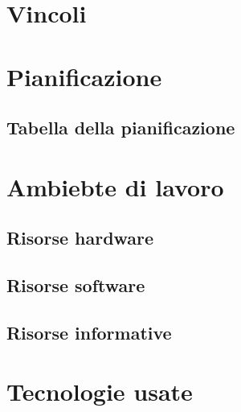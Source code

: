 \section{Vincoli}

\section{Pianificazione}
\subsection{Tabella della pianificazione}

\section{Ambiebte di lavoro}
\subsection{Risorse hardware}
\subsection{Risorse software}
\subsection{Risorse informative}

\section{Tecnologie usate}